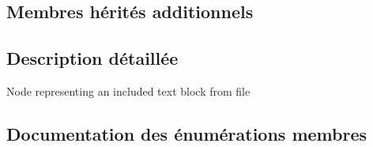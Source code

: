\subsection*{Membres hérités additionnels}


\subsection{Description détaillée}
Node representing an included text block from file 

\subsection{Documentation des énumérations membres}
\hypertarget{class_doc_include_a72aa0fd397546547aadf356348ff3eaf}{}
